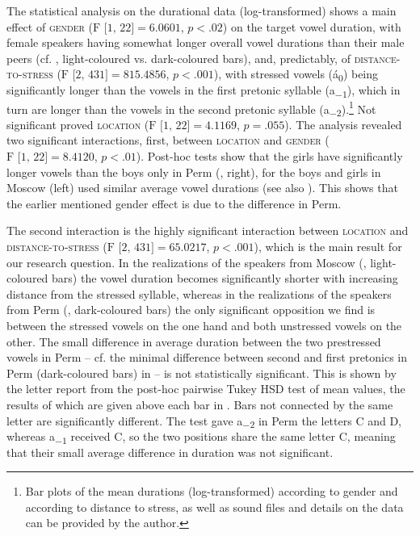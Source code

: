 \documentclass[output=paper,colorlinks,citecolor=black]{langscibook}
\begin{document}
The statistical analysis on the durational data (log-transformed) shows a main effect of \textsc{gender} ($\text{F [1, 22]} = 6.0601$, $p < .02$) on the target vowel duration, with female speakers having somewhat longer overall vowel durations than their male peers (cf. , light-coloured vs. dark-coloured bars), and, predictably, of \textsc{distance}{}-\textsc{to}{}-\textsc{stress} ($\text{F [2, 431]} = 815.4856$, $p < .001$), with stressed vowels (á\textsubscript{\tiny{$0$}}) being significantly longer than the vowels in the first pretonic syllable (a\textsubscript{\tiny{$-1$}}), which in turn are longer than the vowels in the second pretonic syllable (a\textsubscript{\tiny{$-2$}}).\footnote{Bar plots of the mean durations (log-transformed) according to gender and according to distance to stress, as well as sound files and details on the data can be provided by the author.} Not significant proved \textsc{location} ($\text{F [1, 22]} = 4.1169$, $p = .055$). The analysis revealed two significant interactions, first, between \textsc{location} and \textsc{gender} ($\text{F [1, 22]} = 8.4120$, $p < .01$). Post-hoc tests show that the girls have significantly longer vowels than the boys only in Perm (, right), for the boys and girls in Moscow (left) used similar average vowel durations (see also \citealt{Post2024}). This shows that the earlier mentioned gender effect is due to the difference in Perm.



The second interaction is the highly significant interaction between \textsc{location} and \textsc{distance-to-}\textsc{stress} ($\text{F [2, 431]} = 65.0217$, $p < .001$), which is the main result for our research question. In the realizations of the speakers from Moscow (, light-coloured bars) the vowel duration becomes significantly shorter with increasing distance from the stressed syllable, whereas in the realizations of the speakers from Perm (, dark-coloured bars) the only significant opposition we find is between the stressed vowels on the one hand and both unstressed vowels on the other. The small difference in average duration between the two prestressed vowels in Perm -- cf. the minimal difference between second and first pretonics in Perm (dark-coloured bars) in  -- is not statistically significant. This is shown by the letter report from the post-hoc pairwise Tukey HSD test of mean values, the results of which are given above each bar in . Bars not connected by the same letter are significantly different. The test gave a\textsubscript{\tiny{$-2$}} in Perm the letters C and D, whereas a\textsubscript{\tiny{$-1$}} received C, so the two positions share the same letter C, meaning that their small average difference in duration was not significant.
\end{document}
